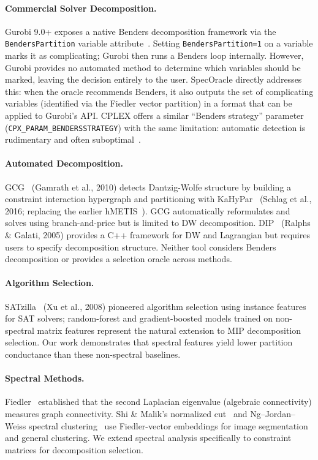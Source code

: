 \documentclass[11pt]{article}
\begin{document}
\paragraph{Commercial Solver Decomposition.} Gurobi 9.0+ exposes a native Benders decomposition framework via the \texttt{BendersPartition} variable attribute~\cite{gurobi-benders}. Setting \texttt{BendersPartition=1} on a variable marks it as complicating; Gurobi then runs a Benders loop internally. However, Gurobi provides no automated method to determine which variables should be marked, leaving the decision entirely to the user. SpecOracle directly addresses this: when the oracle recommends Benders, it also outputs the set of complicating variables (identified via the Fiedler vector partition) in a format that can be applied to Gurobi's API. CPLEX offers a similar ``Benders strategy'' parameter (\texttt{CPX\_PARAM\_BENDERSSTRATEGY}) with the same limitation: automatic detection is rudimentary and often suboptimal~\cite{ibm-cplex}.

\paragraph{Automated Decomposition.} GCG~\cite{gcg} (Gamrath et al., 2010) detects Dantzig-Wolfe structure by building a constraint interaction hypergraph and partitioning with KaHyPar~\cite{kahypar} (Schlag et al., 2016; replacing the earlier hMETIS~\cite{hmetis}). GCG automatically reformulates and solves using branch-and-price but is limited to DW decomposition. DIP~\cite{dip} (Ralphs \& Galati, 2005) provides a C++ framework for DW and Lagrangian but requires users to specify decomposition structure. Neither tool considers Benders decomposition or provides a selection oracle across methods.

\paragraph{Algorithm Selection.} SATzilla~\cite{xu2008} (Xu et al., 2008) pioneered algorithm selection using instance features for SAT solvers; random-forest and gradient-boosted models trained on non-spectral matrix features represent the natural extension to MIP decomposition selection. Our work demonstrates that spectral features yield lower partition conductance than these non-spectral baselines.

\paragraph{Spectral Methods.} Fiedler~\cite{fiedler1973} established that the second Laplacian eigenvalue (algebraic connectivity) measures graph connectivity. Shi \& Malik's normalized cut~\cite{shi2000} and Ng--Jordan--Weiss spectral clustering~\cite{ng2002} use Fiedler-vector embeddings for image segmentation and general clustering. We extend spectral analysis specifically to constraint matrices for decomposition selection.
\end{document}
